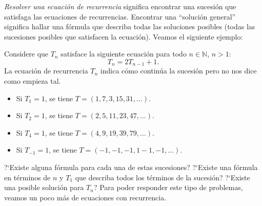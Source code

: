 \textit{Resolver una ecuación de recurrencia} significa encontrar una sucesión que satisfaga las ecuaciones de recurrencias. Encontrar una ``solución general'' significa hallar una fórmula que describa todas las soluciones posibles (todas las sucesiones posibles que satisfacen la ecuación). Veamos el siguiente ejemplo:

\begin{example}{}
	Considere que $T_{n}$ satisface la siguiente ecuación para todo $n\in\mathds{N}$, $n>1$:
	\begin{equation*}
	T_{n}=2T_{n-1}+1.
	\end{equation*}
	La ecuación de recurrencia $T_{n}$ indica cómo continúa la sucesión pero no nos dice como empieza tal. %
	\begin{itemize}
		\item Si $T_{1}=1$, se tiene $T=\left(1,7,3,15,31,\ldots\right)$.
		\item Si $T_{2}=1$, se tiene $T=\left(2,5,11,23,47,\ldots\right)$.
		\item Si $T_{4}=1$, se tiene $T=\left(4,9,19,39,79,\ldots\right)$.
		\item Si $T_{-1}=1$, se tiene $T=\left(-1,-1,-1,1-1,-1,\ldots\right)$.
	\end{itemize}
	?`Existe alguna fórmula para cada una de estas sucesiones? ?`Existe una fórmula en términos de $n$ y $T_{1}$ que describa todos los términos de la sucesión? ?`Existe una posible solución para $T_{n}$? Para poder responder este tipo de problemas, veamos un poco más de ecuaciones con recurrencia.
\end{example}

